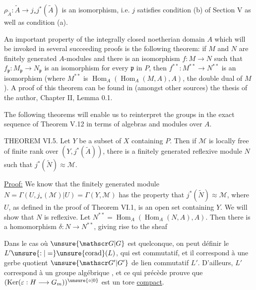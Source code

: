 
$\rho_{\widetilde A}:\widetilde A\longrightarrow j_*j^*(\widetilde A)$ is an isomorphism, i.e. $j$ satisfies condition (b) of Section V as well as condition (a).

An important property of the integrally closed noetherian domain $A$ which will be invoked in several succeeding proofs is the following theorem: if $M$ and $N$ are finitely generated $A$-modules and there is an isomorphism $f:M\longrightarrow N$ such that $f_{\mathfrak p}:M_{\mathfrak p}\longrightarrow N_{\mathfrak p}$ is an isomorphism for every $\mathfrak p$ in $P$, then $f^{**}:M^{**}\longrightarrow N^{**}$ is an isomorphism (where $M^{**}$ is $\operatorname{Hom}_A(\operatorname{Hom}_A(M,A),A)$, the double dual of $M$). A proof of this theorem can be found in (amongst other sources) the thesis of the author, Chapter II, Lemma 0.1.

The following theorems will enable us to reinterpret the groups in the exact sequence of Theorem V.12 in terms of algebras and modules over $A$.

THEOREM VI.5. Let $Y$ be a subset of $X$ containing $P$. Then if $\mathcal M$ is locally free of finite rank over $(Y,j^*(\widetilde A))$, there is a finitely generated reflexive module $N$ such that $j^*(\widetilde N)\approx\mathcal M$.

\uline{Proof:} We know that the finitely generated module $N=\Gamma(U,j_*(\mathcal M)|U)=\Gamma(Y,\mathcal M)$ has the property that $j^*(\widetilde N)\approx\mathcal M$, where $U$, as defined in the proof of Theorem VI.1, is an open set containing $Y$. We will show that $N$ is reflexive. Let $N^{**}=\operatorname{Hom}_A(\operatorname{Hom}_A(N,A),A)$. Then there is a homomorphism $\delta:N\longrightarrow N^{**}$, giving rise to the sheaf



Dans le cas où $\unsure{\mathscr G|G}$ est quelconque, on peut définir  le  $L'\unsure{:|=}\unsure{\operatorname{corad}}(L)$, qui est commutatif, et il correspond à une gerbe quotient $\unsure{\mathscr G'|G'}$ de lien commutatif $L'$. D'ailleurs, $L'$ correspond à un groupe algébrique , et ce qui précède prouve que $(\operatorname{Ker}(\varepsilon:H\longrightarrow G_m))^{\unsure{\circ|0}}$ est un tore \uline{compact}.


